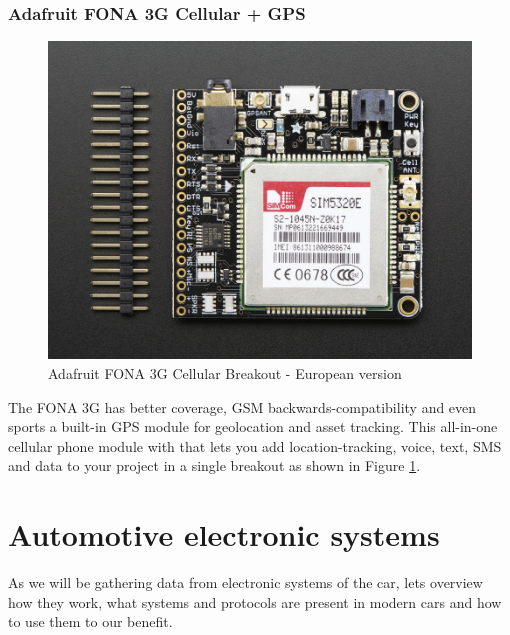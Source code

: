 \subsubsection{Adafruit FONA 3G Cellular + GPS} %
\label{ssub:adafruit_fona_3g_cellular_gps}
\begin{figure}[H]
\begin{center}
\captionsetup{font=small}
\includegraphics[scale=0.85]{pics/3g.jpg}
\caption{Adafruit FONA 3G Cellular Breakout - European version\cite{ada_3g}}
\label{fig:3g}
\end{center}
\end{figure}
The FONA 3G has better coverage, GSM backwards-compatibility and even sports a built-in GPS module for geolocation and asset tracking. This all-in-one cellular phone module with that lets you add location-tracking, voice, text, SMS and data to your project in a single breakout as shown in Figure \ref{fig:3g}.\cite{ada_3g}


\section{Automotive electronic systems}
As we will be gathering data from electronic systems of the car, lets overview how they work, what systems and protocols are present in modern cars and how to use them to our benefit.

